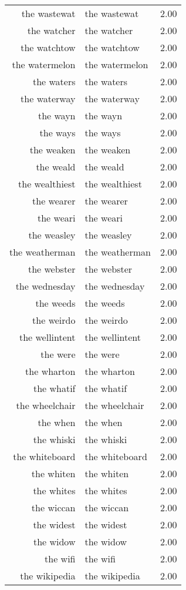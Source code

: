 \begin{table}[ht]
\begin{tabular}{rlr}
  the wastewat & the wastewat & 2.00 \\ 
  the watcher & the watcher & 2.00 \\ 
  the watchtow & the watchtow & 2.00 \\ 
  the watermelon & the watermelon & 2.00 \\ 
  the waters & the waters & 2.00 \\ 
  the waterway & the waterway & 2.00 \\ 
  the wayn & the wayn & 2.00 \\ 
  the ways & the ways & 2.00 \\ 
  the weaken & the weaken & 2.00 \\ 
  the weald & the weald & 2.00 \\ 
  the wealthiest & the wealthiest & 2.00 \\ 
  the wearer & the wearer & 2.00 \\ 
  the weari & the weari & 2.00 \\ 
  the weasley & the weasley & 2.00 \\ 
  the weatherman & the weatherman & 2.00 \\ 
  the webster & the webster & 2.00 \\ 
  the wednesday & the wednesday & 2.00 \\ 
  the weeds & the weeds & 2.00 \\ 
  the weirdo & the weirdo & 2.00 \\ 
  the wellintent & the wellintent & 2.00 \\ 
  the were & the were & 2.00 \\ 
  the wharton & the wharton & 2.00 \\ 
  the whatif & the whatif & 2.00 \\ 
  the wheelchair & the wheelchair & 2.00 \\ 
  the when & the when & 2.00 \\ 
  the whiski & the whiski & 2.00 \\ 
  the whiteboard & the whiteboard & 2.00 \\ 
  the whiten & the whiten & 2.00 \\ 
  the whites & the whites & 2.00 \\ 
  the wiccan & the wiccan & 2.00 \\ 
  the widest & the widest & 2.00 \\ 
  the widow & the widow & 2.00 \\ 
  the wifi & the wifi & 2.00 \\ 
  the wikipedia & the wikipedia & 2.00 \\ 

\end{tabular}
\end{table}
